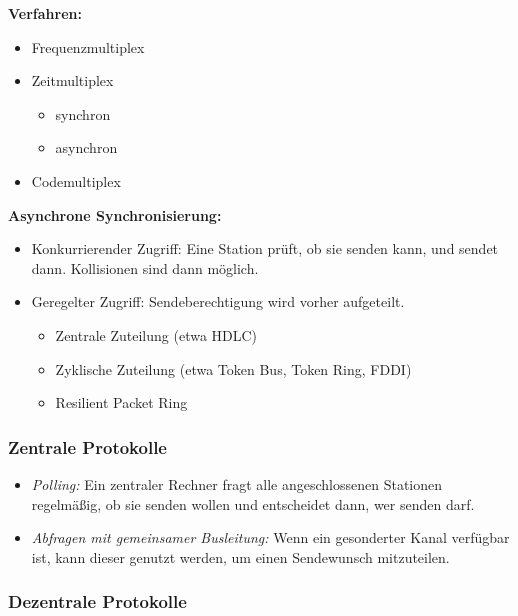 \documentclass[a4paper,parskip=half*,DIV=15,fontsize=11pt]{scrartcl}
\begin{document}
\begin{minipage}[t]{0.35\textwidth}
\textbf{Verfahren:}
\begin{itemize}
\item Frequenzmultiplex
\item Zeitmultiplex
	\begin{itemize}
	\item synchron
    \item asynchron
	\end{itemize}
\item Codemultiplex
\end{itemize}
\end{minipage}
\begin{minipage}[t]{0.65\textwidth}
\textbf{Asynchrone Synchronisierung:}
\begin{itemize}
\item Konkurrierender Zugriff: Eine Station prüft, ob sie senden kann, und sendet dann. Kollisionen sind dann möglich.
\item Geregelter Zugriff: Sendeberechtigung wird vorher aufgeteilt.
	\begin{itemize}
    \item Zentrale Zuteilung (etwa HDLC)
	\item Zyklische Zuteilung (etwa Token Bus, Token Ring, FDDI)
    \item Resilient Packet Ring
	\end{itemize}
\end{itemize}
\end{minipage}

\subsubsection{Zentrale Protokolle}

\begin{itemize}
\item \emph{Polling:} Ein zentraler Rechner fragt alle angeschlossenen Stationen regelmäßig, ob sie senden wollen und entscheidet dann, wer senden darf.
\item \emph{Abfragen mit gemeinsamer Busleitung:} Wenn ein gesonderter Kanal verfügbar ist, kann dieser genutzt werden, um einen Sendewunsch mitzuteilen.
\end{itemize}

\subsubsection{Dezentrale Protokolle}
\end{document}
